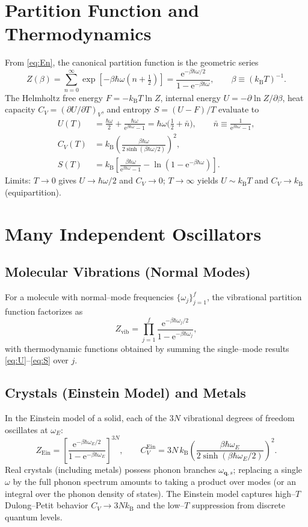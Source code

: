 \documentclass[12pt]{article}
\numberwithin{equation}{section}
\newcommand{\kB}{k_{\mathrm B}}
\newcommand{\ee}{\mathrm e}
\newcommand{\h}{\hbar}
\newcommand{\w}{\omega}
\begin{document}
\section{Partition Function and Thermodynamics}
From \eqref{eq:En}, the canonical partition function is the geometric series
\begin{equation}
Z(\beta)=\sum_{n=0}^{\infty}\exp\!\left[-\beta\h\w\left(n+\tfrac12\right)\right]=\frac{\ee^{-\beta\h\w/2}}{1-\ee^{-\beta\h\w}}, \qquad \beta\equiv(\kB T)^{-1}.
\label{eq:Z}
\end{equation}
The Helmholtz free energy $F=-\kB T\ln Z$, internal energy $U=-\partial\ln Z/\partial\beta$, heat capacity $C_V=(\partial U/\partial T)_V$, and entropy $S=(U-F)/T$ evaluate to
\begin{align}
U(T)&=\frac{\h\w}{2}+\frac{\h\w}{\ee^{\beta\h\w}-1}=\h\w\Big(\tfrac12+\bar n\Big), \qquad \bar n\equiv\frac{1}{\ee^{\beta\h\w}-1},\label{eq:U}\\
C_V(T)&=\kB\left(\frac{\beta\h\w}{2\sinh(\beta\h\w/2)}\right)^{\!2},\label{eq:Cv}\\
S(T)&=\kB\left[\frac{\beta\h\w}{\ee^{\beta\h\w}-1}-\ln\!\left(1-\ee^{-\beta\h\w}\right)\right].\label{eq:S}
\end{align}
Limits: $T\to0$ gives $U\to\h\w/2$ and $C_V\to0$; $T\to\infty$ yields $U\sim \kB T$ and $C_V\to\kB$ (equipartition).

\section{Many Independent Oscillators}
\subsection{Molecular Vibrations (Normal Modes)}
For a molecule with normal--mode frequencies $\{\w_j\}_{j=1}^f$, the vibrational partition function factorizes as
\begin{equation}
Z_{\mathrm{vib}}=\prod_{j=1}^{f}\frac{\ee^{-\beta\h\w_j/2}}{1-\ee^{-\beta\h\w_j}},
\label{eq:Zvib}
\end{equation}
with thermodynamic functions obtained by summing the single--mode results \eqref{eq:U}--\eqref{eq:S} over $j$.

\subsection{Crystals (Einstein Model) and Metals}
In the Einstein model of a solid, each of the $3N$ vibrational degrees of freedom oscillates at $\w_E$:
\begin{equation}
Z_{\mathrm{Ein}}=\left[\frac{\ee^{-\beta\h\w_E/2}}{1-\ee^{-\beta\h\w_E}}\right]^{3N}, \qquad C_V^{\mathrm{Ein}}=3N\,\kB\left(\frac{\beta\h\w_E}{2\sinh(\beta\h\w_E/2)}\right)^{\!2}.
\label{eq:Ein}
\end{equation}
Real crystals (including metals) possess phonon branches $\w_{\bm q,s}$; replacing a single $\w$ by the full phonon spectrum amounts to taking a product over modes (or an integral over the phonon density of states). The Einstein model captures high--$T$ Dulong--Petit behavior $C_V\to3N\kB$ and the low--$T$ suppression from discrete quantum levels.
\end{document}

